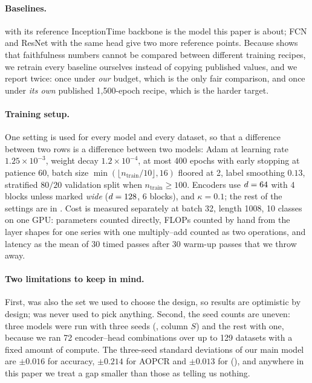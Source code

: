 \paragraph{Baselines.}
\millet{} with its reference InceptionTime backbone \citep{fawaz2020inceptiontime} is the model this
paper is about; FCN and ResNet \citep{wang2017fcn} with the same head give two more reference points.
Because  shows that faithfulness numbers cannot be compared between different
training recipes, we retrain every baseline ourselves instead of copying published values, and we
report \millet{} twice: once under \emph{our} budget, which is the only fair comparison, and once
under \emph{its own} published 1{,}500-epoch recipe, which is the harder target.

\paragraph{Training setup.}
One setting is used for every model and every dataset, so that a difference between two rows is a
difference between two models: Adam \citep{kingma2015adam} at learning rate $1.25\times10^{-3}$,
weight decay $1.2\times10^{-4}$, at most 400 epochs with early stopping at patience 60, batch size
$\min(\lfloor n_{\mathrm{train}}/10 \rfloor, 16)$ floored at 2, label smoothing $0.13$, stratified
$80/20$ validation split when $n_{\mathrm{train}} \ge 100$. Encoders use $d = 64$ with 4 blocks
unless marked \emph{wide} ($d = 128$, 6 blocks), and $\kappa = 0.1$; the rest of the settings
are in . Cost is measured separately at batch 32, length 1008, 10 classes on one
GPU: parameters counted directly, FLOPs counted by hand from the layer shapes for one series with one
multiply--add counted as two operations, and latency as the mean of 30 timed passes after 30 warm-up
passes that we throw away.

\paragraph{Two limitations to keep in mind.}
First, \webtraffic{} was also the set we used to choose the design, so \webtraffic{} results are
optimistic by design; \ucr{} was never used to pick anything. Second, the seed counts are uneven:
three models were run with three seeds (, column $S$) and the rest with one, because
we ran 72 encoder--head combinations over up to 129 datasets with a fixed amount of compute. The
three-seed standard deviations of our main model are $\pm 0.016$ for accuracy, $\pm 0.214$ for AOPCR
and $\pm 0.013$ for \ndcg{} (), and anywhere in this paper we treat a gap smaller than
those as telling us nothing.
